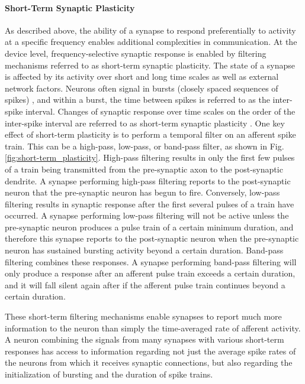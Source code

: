 \documentclass[twocolumn]{article}
\begin{document}
\paragraph{\label{sec:short_term_plasticity}Short-Term Synaptic Plasticity}
As described above, the ability of a synapse to respond preferentially to activity at a specific frequency enables additional complexities in communication. At the device level, frequency-selective synaptic response is enabled by filtering mechanisms referred to as short-term synaptic plasticity. 
The state of a synapse is affected by its activity over short and long time scales as well as external network factors. Neurons often signal in bursts (closely spaced sequences of spikes) \cite{iz2007}, and within a burst, the time between spikes is referred to as the inter-spike interval. Changes of synaptic response over time scales on the order of the inter-spike interval are referred to as short-term synaptic plasticity \cite{abre2004}. One key effect of short-term plasticity is to perform a temporal filter on an afferent spike train. This can be a high-pass, low-pass, or band-pass filter, as shown in Fig.\,\ref{fig:short-term_plasticity}. High-pass filtering results in only the first few pulses of a train being transmitted from the pre-synaptic axon to the post-synaptic dendrite. A synapse performing high-pass filtering reports to the post-synaptic neuron that the pre-synaptic neuron has begun to fire. Conversely, low-pass filtering results in synaptic response after the first several pulses of a train have occurred. A synapse performing low-pass filtering will not be active unless the pre-synaptic neuron produces a pulse train of a certain minimum duration, and therefore this synapse reports to the post-synaptic neuron when the pre-synaptic neuron has sustained bursting activity beyond a certain duration. Band-pass filtering combines these responses. A synapse performing band-pass filtering will only produce a response after an afferent pulse train exceeds a certain duration, and it will fall silent again after if the afferent pulse train continues beyond a certain duration.

These short-term filtering mechanisms enable synapses to report much more information to the neuron than simply the time-averaged rate of afferent activity. A neuron combining the signals from many synapses with various short-term responses has access to information regarding not just the average spike rates of the neurons from which it receives synaptic connections, but also regarding the initialization of bursting and the duration of spike trains.
\end{document}
